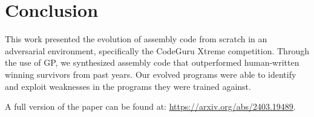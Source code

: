 \documentclass[dvipsnames, format=sigconf]{acmart}
\begin{document}
\section{Conclusion}
This work presented the evolution of assembly code from scratch in an adversarial environment, specifically the CodeGuru Xtreme competition. Through the use of GP, we synthesized assembly code that outperformed human-written winning survivors from past years. Our evolved programs were able to identify and exploit weaknesses in the programs they were trained against. 

A full version of the paper can be found at: \url{https://arxiv.org/abs/2403.19489}.






  

\clearpage
\appendix
\end{document}

